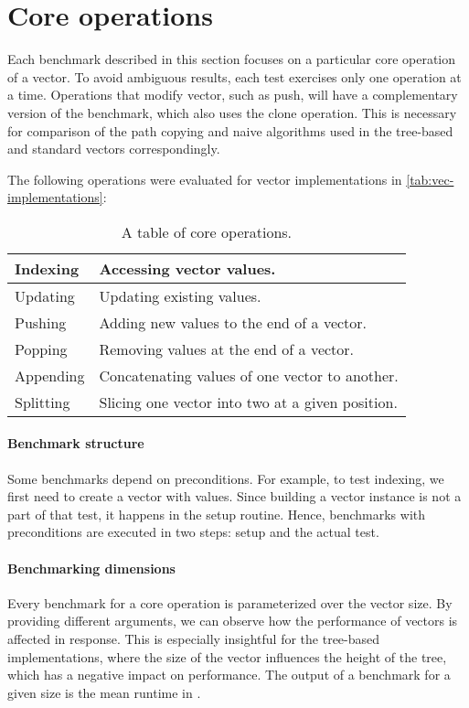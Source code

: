 \section{Core operations}
Each benchmark described in this section focuses on a particular core operation of a vector. To avoid ambiguous results, each test exercises only one operation at a time. Operations that modify vector, such as push, will have a complementary version of the benchmark, which also uses the clone operation. This is necessary for comparison of the path copying and naive algorithms used in the tree-based and standard vectors correspondingly.

The following operations were evaluated for vector implementations in \ref{tab:vec-implementations}:
\begin{table}[!htbp]
    \centering

    \begin{tabular} { |l| p{10cm} | }
        \hline
        Indexing & Accessing vector values. \\ \hline
        Updating & Updating existing values. \\ \hline
        Pushing & Adding new values to the end of a vector. \\ \hline
        Popping & Removing values at the end of a vector. \\ \hline
        Appending & Concatenating values of one vector to another. \\ \hline
        Splitting & Slicing one vector into two at a given position. \\ \hline
    \end{tabular}

    \label{tab:vec-core-operations}
    \caption{A table of core operations.}
\end{table}

\paragraph{Benchmark structure}
Some benchmarks depend on preconditions. For example, to test indexing, we first need to create a vector with values. Since building a vector instance is not a part of that test, it happens in the setup routine. Hence, benchmarks with preconditions are executed in two steps: setup and the actual test.

\paragraph{Benchmarking dimensions}
Every benchmark for a core operation is parameterized over the vector size. By providing different arguments, we can observe how the performance of vectors is affected in response. This is especially insightful for the tree-based implementations, where the size of the vector influences the height of the tree, which has a negative impact on performance. The output of a benchmark for a given size is the mean runtime in \millis{}.

